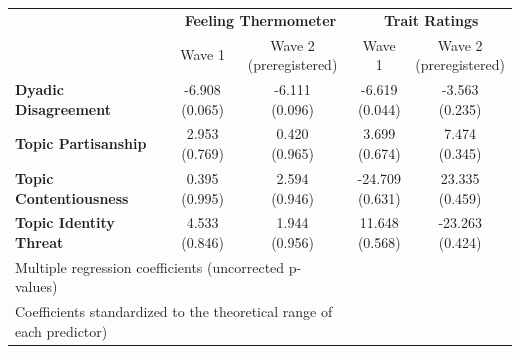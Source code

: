 \begin{tabular}{lcccc}
\hline
\multirow{2}{*}{~} & \multicolumn{2}{c}{\textbf{Feeling Thermometer}} & \multicolumn{2}{c}{\textbf{Trait Ratings}} \\
 & Wave 1 & \makecell{Wave 2 \\ (preregistered)} & Wave 1 & \makecell{Wave 2 \\ (preregistered)} \\
\hline

\textbf{Dyadic Disagreement} & \makecell{-6.908 \\ (0.065)} & \makecell{-6.111 \\ (0.096)} & \makecell{-6.619 \\ (0.044)} & \makecell{-3.563 \\ (0.235)} \\
\textbf{Topic Partisanship} & \makecell{2.953 \\ (0.769)} & \makecell{0.420 \\ (0.965)} & \makecell{3.699 \\ (0.674)} & \makecell{7.474 \\ (0.345)} \\
\textbf{Topic Contentiousness} & \makecell{0.395 \\ (0.995)} & \makecell{2.594 \\ (0.946)} & \makecell{-24.709 \\ (0.631)} & \makecell{23.335 \\ (0.459)} \\
\textbf{Topic Identity Threat} & \makecell{4.533 \\ (0.846)} & \makecell{1.944 \\ (0.956)} & \makecell{11.648 \\ (0.568)} & \makecell{-23.263 \\ (0.424)} \\
\hline
 \multicolumn{3}{l}{\footnotesize Multiple regression coefficients (uncorrected p-values)}\\
 \multicolumn{3}{l}{\footnotesize Coefficients standardized to the theoretical range of each predictor)}\\
 \hline
\end{tabular}
